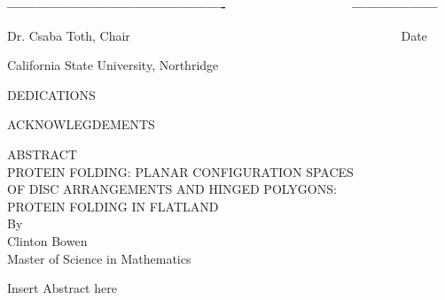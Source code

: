 \vspace*{30pt}

\textbf{---------------------------------------------- \ \ \
\ \ \ \ \ \ \ \ \ \ \ \ \ \ ------------------}


Dr. Csaba Toth, Chair \ \ \ \ \ \ \ \ \ \ \ \ \ \ \ \ \ \ \ \ \ \ \ \ \ \ \ \ \ \ \ \ \ \ \ \ \ \ \ \ \ \ \ Date


\vspace*{225pt}

\begin{center}
California State University, Northridge
\end{center}

\pagebreak

\begin{center}
DEDICATIONS
% 
% 
\end{center}

\pagebreak

\begin{center}
ACKNOWLEGDEMENTS
\end{center}
\vspace{80pt}



\pagebreak

\renewcommand\contentsname{Table of Contents}
\tableofcontents


\pagebreak
{}
\begin{center}
ABSTRACT \\
\vspace*{2em}
PROTEIN FOLDING: PLANAR CONFIGURATION SPACES\\
\vspace{15pt}
OF DISC ARRANGEMENTS AND HINGED POLYGONS:\\
\vspace{15pt}
PROTEIN FOLDING IN FLATLAND\\
\vspace{20pt}
By\\
\vspace{30pt}
Clinton Bowen \\
\vspace{30pt}
Master of Science in Mathematics 
\end{center}
\vspace{30pt}

Insert Abstract here


\pagebreak
{}
